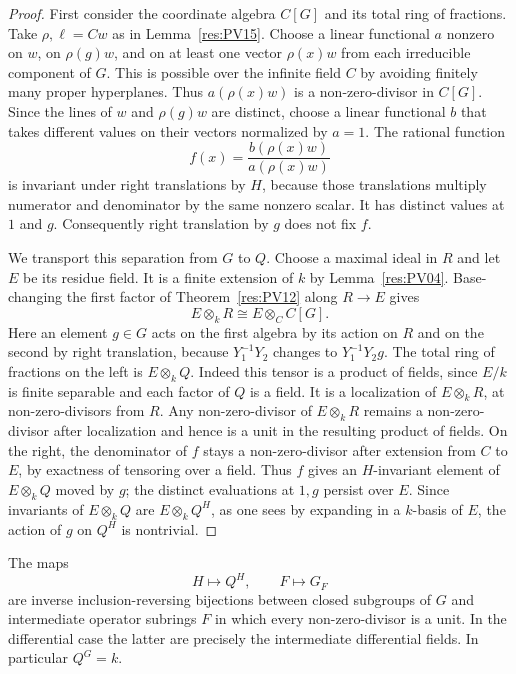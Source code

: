 \begin{proof}
First consider the coordinate algebra \(C[G]\) and its total
ring of fractions. Take \(\rho,\ell=Cw\) as in
Lemma~\ref{res:PV15}. Choose a linear functional \(a\)
nonzero on \(w\), on \(\rho(g)w\), and on at least one vector
\(\rho(x)w\) from each irreducible component of \(G\).
This is possible over the infinite field \(C\) by avoiding
finitely many proper hyperplanes. Thus \(a(\rho(x)w)\)
is a non-zero-divisor in \(C[G]\). Since the lines of
\(w\) and \(\rho(g)w\) are distinct, choose a linear functional
\(b\) that takes different values on their vectors normalized
by \(a=1\). The rational function
\[
 f(x)=\frac{b(\rho(x)w)}{a(\rho(x)w)}
\]
is invariant under right translations by \(H\), because those
translations multiply numerator and denominator by the same
nonzero scalar. It has distinct values at \(1\) and \(g\).
Consequently right translation by \(g\) does not fix \(f\).

We transport this separation from \(G\) to \(Q\). Choose a
maximal ideal in \(R\) and let \(E\) be its residue field.
It is a finite extension of \(k\) by Lemma~\ref{res:PV04}.
Base-changing the first factor of Theorem~\ref{res:PV12}
along \(R\to E\) gives
\[
 E\otimes_k R\cong E\otimes_C C[G].
\]
Here an element \(g\in G\) acts on the first algebra by its
action on \(R\) and on the second by right translation,
because \(Y_1^{-1}Y_2\) changes to \(Y_1^{-1}Y_2g\).
The total ring of fractions on the left is \(E\otimes_k Q\).
Indeed this tensor is a product of fields, since
\(E/k\) is finite separable and each factor of \(Q\) is a field.
It is a localization of \(E\otimes_k R\), at non-zero-divisors
from \(R\). Any non-zero-divisor of \(E\otimes_k R\) remains
a non-zero-divisor after localization and hence is a unit
in the resulting product of fields. On the right, the
denominator of \(f\) stays a non-zero-divisor after extension
from \(C\) to \(E\), by exactness of tensoring over a field.
Thus \(f\) gives an \(H\)-invariant element of \(E\otimes_k Q\)
moved by \(g\); the distinct evaluations at \(1,g\) persist
over \(E\). Since invariants of \(E\otimes_k Q\) are
\(E\otimes_k Q^H\), as one sees by expanding in a \(k\)-basis
of \(E\), the action of \(g\) on \(Q^H\) is nontrivial.
\end{proof}

\begin{theorem}
\label{res:PV17}
The maps
\[
 H\longmapsto Q^H,\qquad
 F\longmapsto G_F
\]
are inverse inclusion-reversing bijections between closed
subgroups of \(G\) and intermediate operator subrings \(F\)
in which every non-zero-divisor is a unit. In the differential
case the latter are precisely the intermediate differential
fields. In particular \(Q^G=k\).
\end{theorem}

